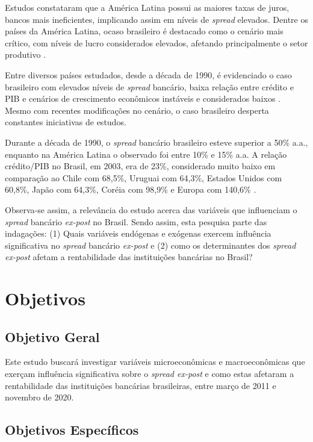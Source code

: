 \documentclass[
  12pt,
  12pt,
  openright,
  oneside,
  a4paper,
  chapter=TITLE,
  section=TITLE,
  subsection=TITLE,
  subsubsection=TITLE,
  english,
  portugues,
  sumario=tradicional]{abntex2}
\begin{document}
Estudos constataram que a América Latina possui as maiores taxas de juros, bancos mais ineficientes, implicando assim em níveis de \emph{spread} elevados. Dentre os países da América Latina, ocaso brasileiro é destacado como o cenário mais crítico, com níveis de lucro considerados elevados, afetando principalmente o setor produtivo \cite{dantas:2012}.

Entre diversos países estudados, desde a década de 1990, é evidenciado o caso brasileiro com elevados níveis de \emph{spread} bancário, baixa relação entre crédito e PIB e cenários de crescimento econômicos instáveis e considerados baixos \cite{levine:1997, matos:2003}. Mesmo com recentes modificações no cenário, o caso brasileiro desperta constantes iniciativas de estudos.

Durante a década de 1990, o \emph{spread} bancário brasileiro esteve superior a 50\% a.a., enquanto na América Latina o observado foi entre 10\% e 15\% a.a. A relação crédito/PIB no Brasil, em 2003, era de 23\%, considerado muito baixo em comparação ao Chile com 68,5\%, Uruguai com 64,3\%, Estados Unidos com 60,8\%, Japão com 64,3\%, Coréia com 98,9\% e Europa com 140,6\% \cite{camargo:2009, singh:2005}.

Observa-se assim, a relevância do estudo acerca das variáveis que influenciam o \emph{spread} bancário \emph{ex-post} no Brasil. Sendo assim, esta pesquisa parte das indagações: (1) Quais variáveis endógenas e exógenas exercem influência significativa no \emph{spread} bancário \emph{ex-post} e (2) como os determinantes dos \emph{spread ex-post} afetam a rentabilidade das instituições bancárias no Brasil?

\section{Objetivos}

\subsection{Objetivo Geral}

Este estudo buscará investigar variáveis microeconômicas e macroeconômicas que exerçam influência significativa sobre o \emph{spread ex-post} e como estas afetaram a rentabilidade das instituições bancárias brasileiras, entre março de 2011 e novembro de 2020.

\subsection{Objetivos Específicos}
\end{document}
